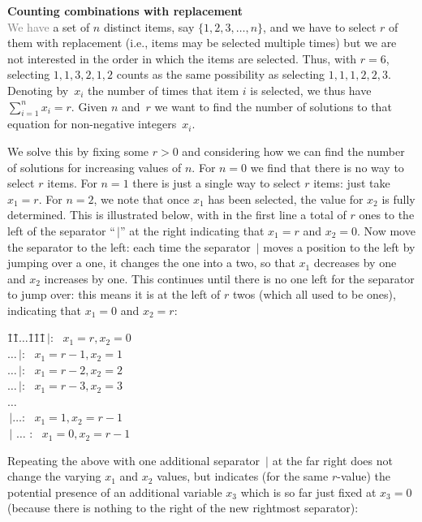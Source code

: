 \documentclass[titlepage]{article}
\theoremstyle{definition}
\numberwithin{equation}{subsection}
\numberwithin{remark}{subsection}
\begin{document}
{\bf{Counting combinations with replacement}}\\
\textcolor{gray}{We have} a set of $n$ distinct items, say $\{1,2,3,\ldots,n\}$, and we have to select $r$ of them with replacement (i.e., items may be selected multiple times) but we are not interested in the order in which the items are selected. Thus, with $r=6$, selecting $1,1,3,2,1,2$ counts as the same possibility as selecting $1,1,1,2,2,3$. Denoting by~$x_i$ the number of times that item $i$ is selected, we thus have $\sum_{i=1}^nx_i=r$. Given $n$ and~$r$ we want to find the number of solutions to that equation for non-negative integers~$x_i$.

We solve this by fixing some $r>0$ and considering how we can find the number of solutions for increasing values of $n$. For $n=0$ we find that there is no way to select $r$ items. For $n=1$ there is just a single way to select $r$ items: just take $x_1=r$.
For $n=2$, we note that once $x_1$ has been selected, the value for $x_2$ is fully determined. This is illustrated below, with in the first line a total of $r$ ones to the left of the separator ``$\,|$'' at the right indicating that $x_1=r$ and $x_2=0$. Now move the separator to the left: each time the separator $\,|$ moves a position to the left by jumping over a one, it changes the one into a two, so that $x_1$ decreases by one and $x_2$ increases by one. This continues until there is no one left for the separator to jump over: this means it is at the left of $r$ twos (which all used to be ones), indicating that $x_1=0$ and $x_2=r$:
{\small{\begin{tabbing}
\hspace*{50pt}\=1\=1\=$\ldots$\=1\=1\=1\=$\,|$: $\,\,\,x_1=r, x_2=0$\\
\>$\ldots$\>$\,|$: $\,\,\,x_1=r-1, x_2=1$\\
\>$\ldots$\>$\,|$: $\,\,\,x_1=r-2, x_2=2$\\
\>$\ldots$\>$\,|$: $\,\,\,x_1=r-3, x_2=3$\\
\>\>\>$\ldots$\\
\>$\,|$\>$\ldots$: $\,\,\,x_1=1, x_2=r-1$\\
\>$\,|$    \>$\ldots$        : $\,\,\,x_1=0, x_2=r-1$
\end{tabbing}}}
\par\noindent
Repeating the above with one additional separator $\,|$ at the far right does not change the varying $x_1$ and $x_2$ values, but indicates (for the same $r$-value) the potential presence of an additional variable $x_3$ which is so far just fixed at $x_3=0$ (because there is nothing to the right of the new rightmost separator):
\end{document}
